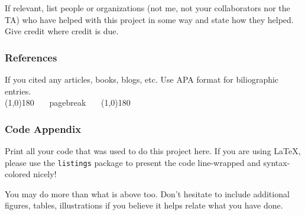 \documentclass[12pt]{article}
\begin{document}
\begin{tcolorbox}
If relevant, list people or organizations (not me, not your collaborators nor the TA) who have helped with this project in some way and state how they helped. Give credit where credit is due.

\subsubsection*{References}

If you cited any articles, books, blogs, etc. Use APA format for biliographic entries.\\

\line(1,0){180} ~~~pagebreak~~~ \line(1,0){180}
\pagebreak

\subsubsection*{Code Appendix}

Print all your code that was used to do this project here. If you are using \LaTeX, please use the \texttt{listings} package to present the code line-wrapped and syntax-colored nicely!

\end{tcolorbox}


\noindent You may do more than what is above too. Don't hesitate to include additional figures, tables, illustrations if you believe it helps relate what you have done.
\end{document}
